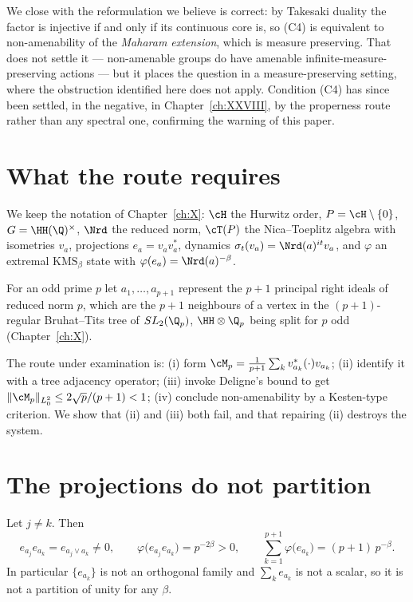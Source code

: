 \begin{summary}
We close with the reformulation we believe is correct: by Takesaki duality the factor is
injective if and only if its continuous core is, so (C4) is equivalent to non-amenability of
the \emph{Maharam extension}, which is measure preserving. That does not settle it --- non-amenable groups do have
amenable infinite-measure-preserving actions --- but it places the question in a
measure-preserving setting, where the obstruction identified here does not apply.
Condition (C4) has since been settled, in the negative, in Chapter~\ref{ch:XXVIII},
by the properness route rather than any spectral one, confirming the warning of this paper.
\end{summary}


\section{What the route requires}

We keep the notation of Chapter~\ref{ch:X}: $\cH$ the Hurwitz order, $P=\cH\setminus\{0\}$,
$G=\HH(\Q)^\times$, $\Nrd$ the reduced norm, $\cT(P)$ the Nica--Toeplitz algebra with
isometries $v_a$, projections $e_a=v_av_a^*$, dynamics $\sigma_t(v_a)=\Nrd(a)^{it}v_a$, and
$\varphi$ an extremal $\mathrm{KMS}_\beta$ state with $\varphi(e_a)=\Nrd(a)^{-\beta}$.

For an odd prime $p$ let $a_1,\dots,a_{p+1}$ represent the $p+1$ principal right ideals of
reduced norm $p$, which are the $p+1$ neighbours of a vertex in the $(p+1)$-regular
Bruhat--Tits tree of $SL_2(\Q_p)$, $\HH\otimes\Q_p$ being split for $p$ odd (Chapter~\ref{ch:X}).

The route under examination is: (i) form
$\cM_p=\frac{1}{p+1}\sum_kv_{a_k}^*(\cdot)v_{a_k}$; (ii) identify it with a tree adjacency
operator; (iii) invoke Deligne's bound to get
$\|\cM_p\|_{L^2_0}\le2\sqrt p/(p+1)<1$; (iv) conclude non-amenability by a Kesten-type
criterion. We show that (ii) and (iii) both fail, and that repairing (ii) destroys the
system.

\section{The projections do not partition}

\begin{proposition}\label{XI:prop:nested}
Let $j\ne k$. Then
\[
e_{a_j}e_{a_k}=e_{a_j\vee a_k}\ne0,\qquad
\varphi\bigl(e_{a_j}e_{a_k}\bigr)=p^{-2\beta}>0,
\qquad
\sum_{k=1}^{p+1}\varphi\bigl(e_{a_k}\bigr)=(p+1)\,p^{-\beta}.
\]
In particular $\{e_{a_k}\}$ is not an orthogonal family and $\sum_ke_{a_k}$ is not a scalar,
so it is not a partition of unity for any $\beta$.
\end{proposition}

